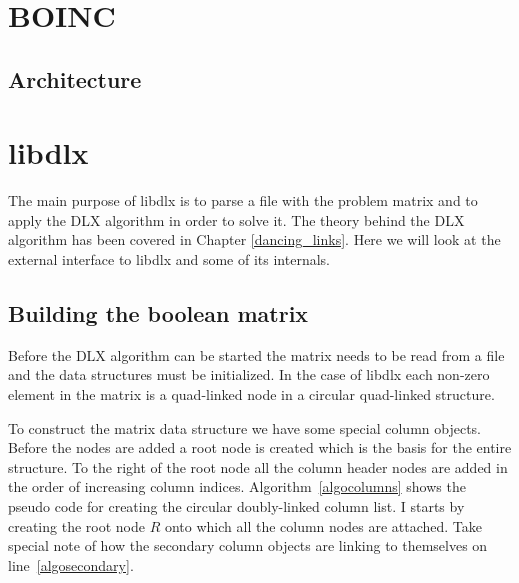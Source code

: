 



\section{BOINC}

\subsection{Architecture}


\section{libdlx}

The main purpose of libdlx is to parse a file with the problem matrix and to apply the DLX algorithm in order to solve it.
The theory behind the DLX algorithm has been covered in Chapter \ref{dancing_links}.
Here we will look at the external interface to libdlx and some of its internals.


\subsection{Building the boolean matrix}
\label{matrix_construction}

Before the DLX algorithm can be started the matrix needs to be read from a file and the data structures must be initialized.
In the case of libdlx each non-zero element in the matrix is a quad-linked node in a circular quad-linked structure.

To construct the matrix data structure we have some special column objects.
Before the nodes are added a root node is created which is the basis for the entire structure.
To the right of the root node all the column header nodes are added in the order of increasing column indices.
Algorithm~\ref{algocolumns} shows the pseudo code for creating the circular doubly-linked column list.
I starts by creating the root node $R$ onto which all the column nodes are attached.
Take special note of how the secondary column objects are linking to themselves on line~\ref{algosecondary}.

